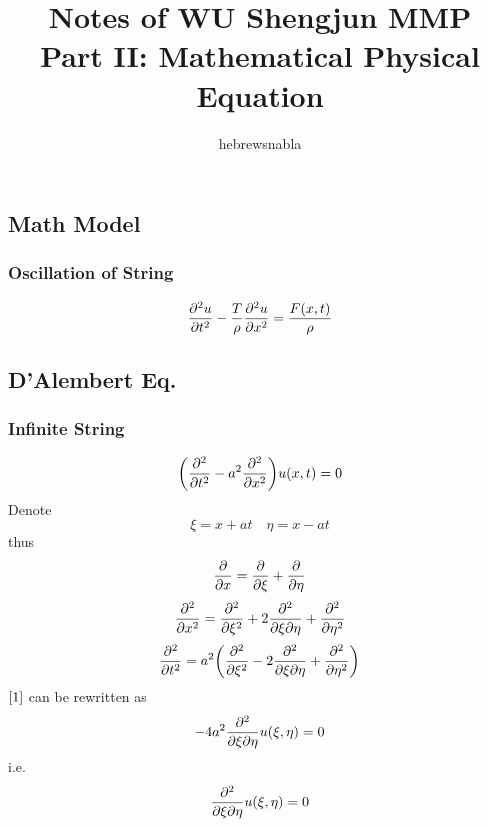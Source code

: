 \documentclass[UTF8]{ctexart} %
\title{Notes of WU Shengjun MMP\\
Part II: Mathematical Physical Equation}
\author{hebrewsnabla}
\numberwithin{equation}{section}
\begin{document}
\maketitle
\setcounter{section}{6}
\section{}
\subsection{Math Model}
\subsubsection{Oscillation of String}
\begin{equation}\label{key}
\pdv[2]{u}{t} - \dfrac{T}{\rho}\pdv[2]{u}{x} = \dfrac{F(x,t)}{\rho}
\end{equation}
\subsection{D'Alembert Eq.}
\subsubsection{Infinite String}
\begin{equation}\label{1}
\qty(\pdv[2]{t} - a^2 \pdv[2]{x})u(x,t) = 0
\end{equation}
Denote
\begin{equation}\label{key}
\xi = x + at \quad \eta = x - at
\end{equation}
thus
\begin{equation}\label{key}
\pdv{x} = \pdv{\xi} + \pdv{\eta}
\end{equation}
\begin{equation}\label{key}
\pdv[2]{x} = \pdv[2]{\xi} + 2\pdv[2]{}{\xi}{\eta} + \pdv[2]{\eta}
\end{equation}
\begin{equation}\label{key}
\pdv[2]{t} = a^2 \qty(\pdv[2]{\xi} - 2\pdv[2]{}{\xi}{\eta} + \pdv[2]{\eta})
\end{equation}
$\eqref{1}$ can be rewritten as
\begin{equation}\label{key}
-4a^2 \pdv{}{\xi}{\eta} u(\xi,\eta) = 0
\end{equation}
i.e.
\begin{equation}\label{key}
\pdv{}{\xi}{\eta} u(\xi,\eta) = 0
\end{equation}
\end{document}
